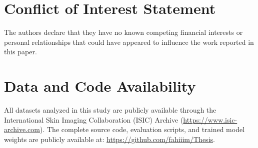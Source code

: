 \documentclass[11pt,a4paper]{article}
\begin{document}
\section*{Conflict of Interest Statement}
The authors declare that they have no known competing financial interests or personal relationships that could have appeared to influence the work reported in this paper.

\section*{Data and Code Availability}
All datasets analyzed in this study are publicly available through the International Skin Imaging Collaboration (ISIC) Archive (\url{https://www.isic-archive.com}). The complete source code, evaluation scripts, and trained model weights are publicly available at: \url{https://github.com/fahiiim/Thesis}.



\end{document}
